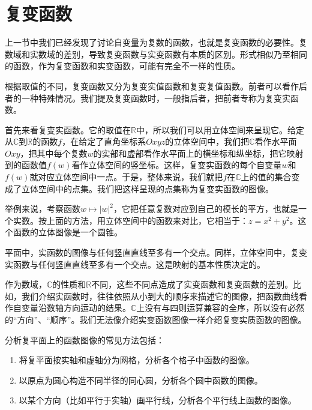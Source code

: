 \documentclass[12pt,UTF8]{ctexbook}
\begin{document}
\section{复变函数}

上一节中我们已经发现了讨论自变量为复数的函数，也就是复变函数的必要性。复数域和实数域的差别，导致复变函数与实变函数有本质的区别。形式相似乃至相同的函数，作为复变函数和实变函数，可能有完全不一样的性质。

根据取值的不同，复变函数又分为复变实值函数和复变复值函数。前者可以看作后者的一种特殊情况。我们提及复变函数时，一般指后者，把前者专称为复变实函数。

首先来看复变实函数。它的取值在$\mathbb{R}$中，所以我们可以用立体空间来呈现它。给定从$\mathbb{C}$到$\mathbb{R}$的函数$f$，在给定了直角坐标系$Oxyz$的立体空间中，我们把$\mathbb{C}$看作水平面$Oxy$，把其中每个复数$w$的实部和虚部看作水平面上的横坐标和纵坐标，把它映射到的函数值$f(w)$看作立体空间的竖坐标。这样，复变实函数的每个自变量$w$和$f(w)$就对应立体空间中一点。于是，整体来说，我们就把$f$在$\mathbb{C}$上的值的集合变成了立体空间中的点集。我们把这样呈现的点集称为复变实函数的图像。

举例来说，考察函数$w\mapsto |w|^2$，它把任意复数对应到自己的模长的平方，也就是一个实数。按上面的方法，用立体空间中的函数来对比，它相当于：$z = x^2 + y^2$。这个函数的立体图像是一个圆锥。

平面中，实函数的图像与任何竖直直线至多有一个交点。同样，立体空间中，复变实函数与任何竖直直线至多有一个交点。这是映射的基本性质决定的。

作为数域，$\mathbb{C}$的性质和$\mathbb{R}$不同，这些不同点造成了实变函数和复变函数的差别。比如，我们介绍实函数时，往往依照从小到大的顺序来描述它的图像，把函数曲线看作自变量沿数轴方向运动的结果。$\mathbb{C}$上没有与四则运算兼容的全序，所以没有必然的“方向”、“顺序”。我们无法像介绍实变函数图像一样介绍复变实质函数的图像。

分析复平面上的函数图像的常见方法包括：
\begin{enumerate}
    \item 将复平面按实轴和虚轴分为网格，分析各个格子中函数的图像。
    \item 以原点为圆心构造不同半径的同心圆，分析各个圆中函数的图像。
    \item 以某个方向（比如平行于实轴）画平行线，分析各个平行线上函数的图像。
\end{enumerate}
\end{document}
